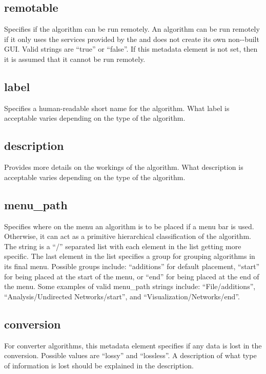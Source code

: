 \subsection*{remotable}
Specifies if the algorithm can be run remotely. An algorithm can be run
remotely if it only uses the services provided by the 
and does not create its own non--built GUI. Valid
strings are ``true'' or ``false''. If this metadata element is not set, then
it is assumed that it cannot be run remotely.

\subsection*{label}
Specifies a human-readable short name for the algorithm. What label is
acceptable varies depending on the type of the algorithm. 

\subsection*{description}
Provides more details on the workings of the algorithm. What
description is acceptable varies depending on the type of the algorithm.

\subsection*{menu\_path}
Specifies where on the menu an algorithm is to be
placed if a menu bar is used. Otherwise, it can act as a primitive hierarchical
classification of the algorithm. The string is a ``/'' separated list with
each element in the list getting more specific. The last element in the list
specifies a group for grouping algorithms in its final menu. Possible groups
include: ``additions'' for default placement, ``start'' for being placed at
the start of the menu, or ``end'' for being placed at the end of the menu. Some
examples of valid menu\_path strings include: ``File/additions'',
``Analysis/Undirected Networks/start'', and ``Visualization/Networks/end''.

\subsection*{conversion}
For converter algorithms, this metadata element specifies if any data is
lost in the conversion. Possible values are ``lossy'' and ``lossless''. A
description of what type of information is lost should be explained in the
description.

